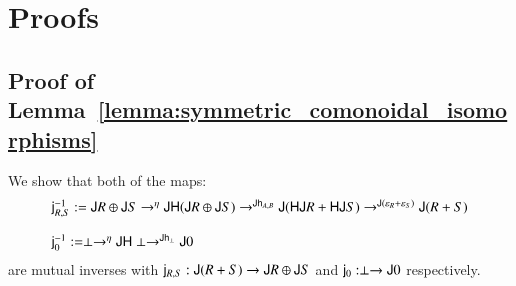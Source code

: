 \section{Proofs}
\label{sec:proofs}

\subsection{Proof of Lemma~\ref{lemma:symmetric_comonoidal_isomorphisms}}
\label{subsec:proof_of_lemma:symmetric_comonoidal_isomorphisms}
We show that both of the  maps:
\[
\begin{array}{lll}
  \mathsf{j}^{-1}_{R,S} := \mathsf{J}R \oplus \mathsf{J}S \rightarrow^{\eta} \mathsf{JH}(\mathsf{J}R \oplus \mathsf{J}S) \rightarrow^{\mathsf{J}\mathsf{h}_{A,B}} \mathsf{J}(\mathsf{HJ}R + \mathsf{HJ}S) \rightarrow^{\mathsf{J}(\varepsilon_R + \varepsilon_S)} \mathsf{J}(R + S)\\
  \\
  \mathsf{j}^{-1}_{0} := \perp \rightarrow^{\eta} \mathsf{JH}\perp \rightarrow^{\mathsf{J}\mathsf{h}_{\perp}} \mathsf{J}0
\end{array}
\]
are mutual inverses with $\mathsf{j}_{R,S} : \mathsf{J}(R + S) \rightarrow \mathsf{J}R
\oplus \mathsf{J}S$ and $\mathsf{j}_{0} : \perp \rightarrow \mathsf{J}0$ respectively.


